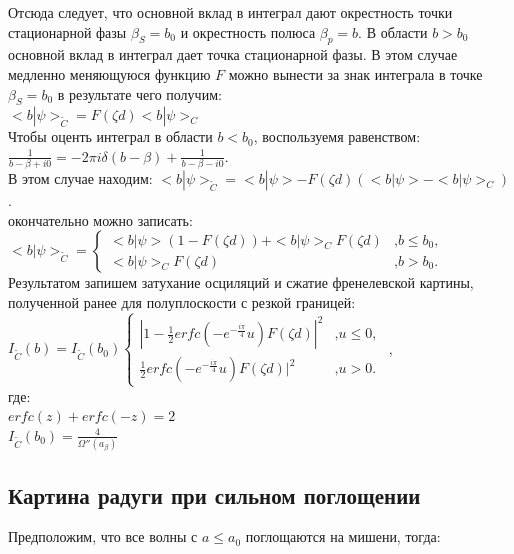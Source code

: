 \documentclass[11pt]{report}
\begin{document}
Отсюда следует, что основной вклад в интеграл дают окрестность точки стационарной фазы $\beta_S = b_0$ и окрестность полюса $\beta_p = b$. В области $b > b_0$ основной вклад в интеграл дает точка стационарной фазы. В этом случае медленно меняющуюся функцию $F$ можно вынести за знак интеграла в точке $\beta_S = b_0$ в результате чего получим:\\

$<b|\psi>_{\tilde C} = F(\zeta d) <b|\psi>_C $ \\

Чтобы оценть интеграл в области $b<b_0 $, воспользуемя равенством: \\

$\frac{1}{b-\beta+i0} = -2\pi i\delta(b-\beta) + \frac{1}{b-\beta - i0 }$.\\

В этом случае находим:
$<b|\psi>_{\tilde C} = <b|\psi> - F(\zeta d)(<b|\psi> - <b|\psi>_C)$. \\

окончательно можно записать: \\

$
<b|\psi>_{\tilde C} = 
\left\{
\begin{array}{lr}
<b|\psi>(1-F(\zeta d)) + <b|\psi>_CF(\zeta d ) & \text{,} b \leq b_0, \\
<b|\psi>_CF(\zeta d ) & \text{,} b > b_0 .
\end{array}
\right.
$ \\

Результатом запишем затухание осциляций и сжатие френелевской картины, полученной ранее для полуплоскости с резкой границей: \\

$
I_{\tilde C}(b) = I_{\tilde C}(b_0)
\left\{
\begin{array}{lr}
|1-\frac{1}{2}erfc(-e^{-\frac{i\pi}{4}}u)F(\zeta d)|^2 & \text{,} u \leq 0, \\
\frac{1}{2}erfc(-e^{-\frac{i\pi}{4}}u)F(\zeta d)|^2 & \text{,} u > 0 .
\end{array}
\right.
$ ,\\

где: \\

$erfc(z)+erfc(-z)=2$ \\

$I_{\tilde C}(b_0) = \frac{4}{\Omega''(a_\beta)}$

\subsection{Картина радуги при сильном поглощении}
Предположим, что все волны с $a \leq a_0 $ поглощаются на мишени, тогда:
\end{document}
